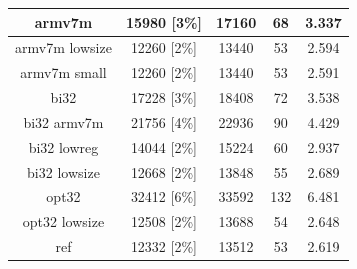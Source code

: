 \documentclass[12pt,a4paper,italian]{report}
\begin{document}
\begin{table}[h]
\begin{tabular}{|c|c|c|c|c|}
        armv7m & 15980 [3\%] & 17160 & 68 & 3.337 \\
        \hline
        armv7m lowsize & 12260 [2\%] & 13440 & 53 & 2.594 \\
        \hline
        armv7m small & 12260 [2\%] & 13440 & 53 & 2.591 \\
        \hline
        bi32 & 17228 [3\%] & 18408 & 72 & 3.538 \\
        \hline
        bi32 armv7m & 21756 [4\%] & 22936 & 90 & 4.429 \\
        \hline
        bi32 lowreg & 14044 [2\%] & 15224 & 60 & 2.937 \\
        \hline
        bi32 lowsize & 12668 [2\%] & 13848 & 55 & 2.689 \\
        \hline
        opt32 & 32412 [6\%] & 33592 & 132 & 6.481 \\
        \hline
        opt32 lowsize & 12508 [2\%] & 13688 & 54 & 2.648 \\
        \hline
        ref & 12332 [2\%] & 13512 & 53 & 2.619 \\
        \hline
    \end{tabular}
\end{table}
\end{document}
